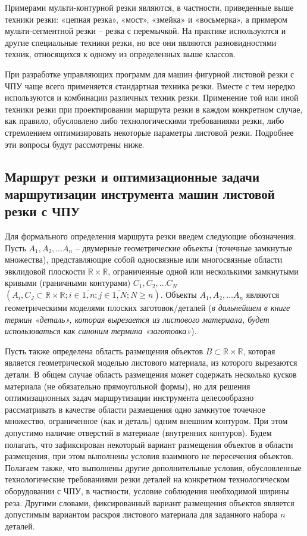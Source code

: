 \documentclass{article}
\begin{document}
Примерами мульти-контурной резки являются,
в частности, приведенные выше техники резки:
«цепная резка», «мост», «змейка» и «восьмерка»,
а примером мульти-сегментной резки –
резка с перемычкой.
На практике используются и другие специальные техники резки,
но все они являются разновидностями техник,
относящихся к одному из определенных выше классов.

При разработке управляющих программ для
машин фигурной листовой резки с ЧПУ чаще всего
применяется стандартная техника резки.
Вместе с тем нередко используются и
комбинации различных техник резки.
Применение той или иной техники резки
при проектировании маршрута резки в
каждом конкретном случае, как правило,
обусловлено либо технологическими требованиями резки,
либо стремлением оптимизировать некоторые
параметры листовой резки.
Подробнее эти вопросы будут рассмотрены ниже.

\subsection{Маршрут резки и оптимизационные задачи маршрутизации инструмента машин листовой резки с ЧПУ}

Для формального определения маршрута резки
введем следующие обозначения.
Пусть
$A_1, A_2, \dots A_n$
– двумерные геометрические объекты (точечные замкнутые множества),
представляющие собой односвязные или
многосвязные области эвклидовой плоскости
$\mathbb R \times \mathbb R$,
ограниченные одной или несколькими замкнутыми кривыми
(граничными контурами)
$C_1, C_2, \dots C_N$
$(A_i, C_J \subset \mathbb R \times \mathbb R;
i \in \overline{1,n};
j \in \overline{1, N};
N \geqslant n)$.
Объекты
$A_1, A_2, \dots A_n$
являются геометрическими моделями плоских заготовок/деталей
({\it в дальнейшем в книге термин «деталь»,
которая вырезается из листового материала,
будет использоваться как синоним термина «заготовка»}).

Пусть также определена область размещения объектов
$B \subset \mathbb R \times \mathbb R$,
которая является геометрической моделью листового материала,
из которого вырезаются детали.
В общем случае область размещения
может содержать несколько кусков материала
(не обязательно прямоугольной формы),
но для решения оптимизационных задач
маршрутизации инструмента целесообразно рассматривать
в качестве области размещения одно замкнутое точечное множество,
ограниченное (как и деталь)
одним внешним контуром.
При этом допустимо наличие отверстий в материале
(внутренних контуров).
Будем полагать, что зафиксирован некоторый вариант размещения
объектов в области размещения,
при этом выполнены условия взаимного не пересечения объектов.
Полагаем также, что выполнены другие дополнительные условия,
обусловленные технологические требованиями резки деталей
на конкретном технологическом оборудовании с ЧПУ,
в частности, условие соблюдения необходимой ширины реза.
Другими словами, фиксированный вариант размещения объектов
является допустимым вариантом раскроя листового материала
для заданного набора $n$ деталей.
\end{document}
